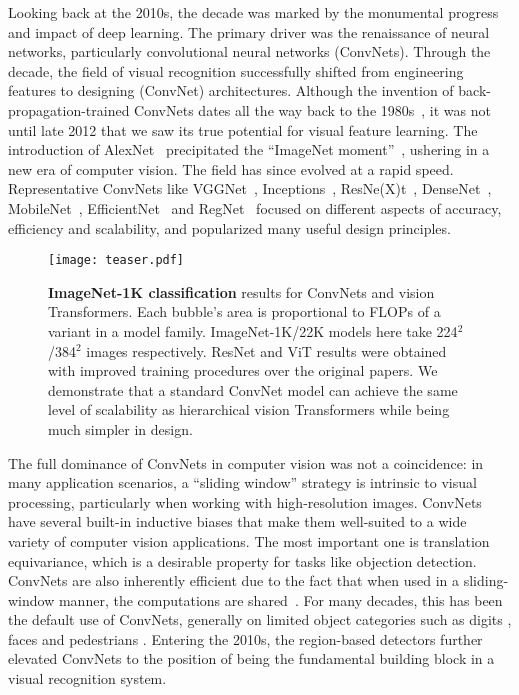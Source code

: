 Looking back at the 2010s, the decade was marked by the monumental progress and impact of deep learning. The primary driver was the renaissance of neural networks, particularly convolutional neural networks (ConvNets). Through the decade, the field of visual recognition successfully shifted from engineering features to designing (ConvNet) architectures. Although the invention of back-propagation-trained ConvNets dates all the way back to the 1980s~\cite{LeCun1989}, it was not until late 2012 that we saw its true potential for visual feature learning. The introduction of AlexNet~\cite{alexnet} precipitated the ``ImageNet moment''~\cite{Russakovsky2015}, ushering in a new era of computer vision. The field has since evolved at a rapid speed. Representative ConvNets like VGGNet~\cite{Simonyan2014}, Inceptions~\cite{Szegedy2015}, ResNe(X)t~\cite{resnet,Xie2017}, DenseNet~\cite{densenet}, MobileNet~\cite{Howard2017}, EfficientNet~\cite{Tan2019efficientnet} and RegNet~\cite{Radosavovic2020designing} focused on different aspects of accuracy, efficiency and scalability, and popularized many useful design principles. 

\begin{figure}[!htbp]
\centering
\texttt{[image: teaser.pdf]}
\caption{\textbf{ImageNet-1K classification} results for \cb ConvNets and \vb vision Transformers. Each bubble's area is proportional to FLOPs of a variant in a model family. ImageNet-1K/22K models here take 224$^2$/384$^2$ images respectively. ResNet and ViT results were obtained with improved training procedures over the original papers. We demonstrate that a standard ConvNet model can achieve the same level of scalability as hierarchical vision Transformers while being much simpler in design.}
\label{fig:teaser}
\end{figure}

The full dominance of ConvNets in computer vision was not a coincidence: in many application scenarios, a ``sliding window'' strategy is intrinsic to visual processing, particularly when working with high-resolution images. ConvNets have several built-in inductive biases that make them well-suited to a wide variety of computer vision applications. The most important one is translation equivariance, which is a desirable property for tasks like objection detection. ConvNets are also inherently efficient due to the fact that when used in a sliding-window manner, the computations are shared~\cite{Sermanet2014}. For many decades, this has been the default use of ConvNets, generally on limited object categories such as digits \cite{lecun1998gradient}, faces \cite{vaillant1994original,rowley1998neural} and pedestrians \cite{sermanet2013pedestrian, dollar2010fastest}. Entering the 2010s, the region-based detectors \cite{rcnn, Girshick2015, Ren2015, He2017} further elevated ConvNets to the position of being the fundamental building block in a visual recognition system. 

